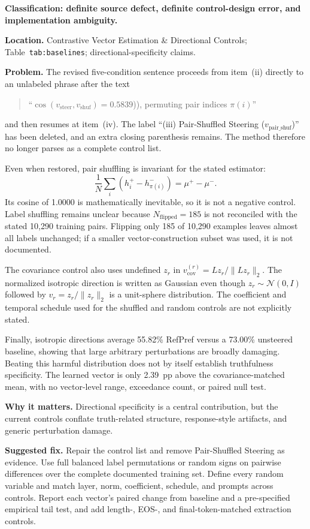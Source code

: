 \documentclass[11pt]{article}
\begin{document}
\textbf{Classification: definite source defect, definite control-design error, and implementation ambiguity.}

\textbf{Location.} Contrastive Vector Estimation \& Directional Controls; Table~\texttt{tab:baselines}; directional-specificity claims.

\textbf{Problem.} The revised five-condition sentence proceeds from item~(ii) directly to an unlabeled phrase after the text
\begin{quote}
``$\cos(v_{\text{steer}},v_{\text{shuf}})=0.5839$)), permuting pair indices $\pi(i)$''
\end{quote}
and then resumes at item~(iv).  The label ``(iii) Pair-Shuffled Steering ($v_{\text{pair\_shuf}}$)'' has been deleted, and an extra closing parenthesis remains.  The method therefore no longer parses as a complete control list.

Even when restored, pair shuffling is invariant for the stated estimator:
\[
\frac{1}{N}\sum_i\left(h_i^+-h_{\pi(i)}^-\right)=\mu^+-\mu^-.
\]
Its cosine of 1.0000 is mathematically inevitable, so it is not a negative control.  Label shuffling remains unclear because $N_{\text{flipped}}=185$ is not reconciled with the stated 10,290 training pairs.  Flipping only 185 of 10,290 examples leaves almost all labels unchanged; if a smaller vector-construction subset was used, it is not documented.

The covariance control also uses undefined $z_r$ in $v_{\text{cov}}^{(r)}=Lz_r/\|Lz_r\|_2$.  The normalized isotropic direction is written as Gaussian even though $z_r\sim\mathcal N(0,I)$ followed by $v_r=z_r/\|z_r\|_2$ is a unit-sphere distribution.  The coefficient and temporal schedule used for the shuffled and random controls are not explicitly stated.

Finally, isotropic directions average 55.82\% RefPref versus a 73.00\% unsteered baseline, showing that large arbitrary perturbations are broadly damaging.  Beating this harmful distribution does not by itself establish truthfulness specificity.  The learned vector is only 2.39~pp above the covariance-matched mean, with no vector-level range, exceedance count, or paired null test.

\textbf{Why it matters.} Directional specificity is a central contribution, but the current controls conflate truth-related structure, response-style artifacts, and generic perturbation damage.

\textbf{Suggested fix.} Repair the control list and remove Pair-Shuffled Steering as evidence.  Use full balanced label permutations or random signs on pairwise differences over the complete documented training set.  Define every random variable and match layer, norm, coefficient, schedule, and prompts across controls.  Report each vector's paired change from baseline and a pre-specified empirical tail test, and add length-, EOS-, and final-token-matched extraction controls.
\end{document}
